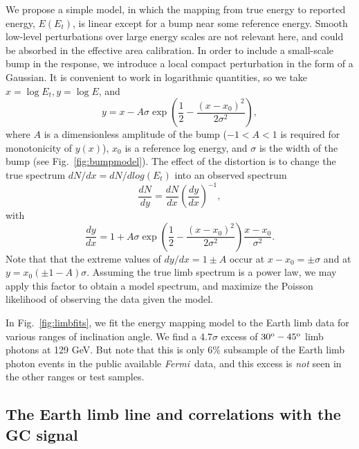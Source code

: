 \documentclass[aps,twocolumn,prd,superscriptaddress,showpacs,nofootinbib,fixfloat]{revtex4}
\newcommand{\be}{\begin{equation}}
\newcommand{\ee}{\end{equation}}
\newcommand{\Fermi}{{\slshape Fermi}}
\newcommand{\degree}{^{\rm o}}
\begin{document}
We propose a simple model, in
which the mapping from true energy to reported energy,
$E(E_t)$, is linear except for a bump near some reference
energy.  Smooth low-level perturbations over large energy
scales are not relevant here, and could be absorbed in the
effective area calibration.  In order to include a
small-scale bump in the response, we introduce a local
compact perturbation in the form of a Gaussian.  It is
convenient to work in logarithmic quantities, so we take
$x=\log E_t, y=\log E$, and \be
\label{eq:yofx}
y=x - A\sigma \exp\left(\frac{1}{2}-\frac{(x-x_0)^2}{2\sigma^2}\right),
\ee
where $A$ is a dimensionless amplitude of the bump ($-1<A<1$
is required for monotonicity of $y(x)$), $x_0$ is a
reference log energy, and $\sigma$ is the width of the bump (see
Fig.~\ref{fig:bumpmodel}).  The effect of the distortion is
to change the true spectrum $dN/dx = dN/dlog(E_t)$ into an
observed spectrum
\be
\label{eq:dndy}
\frac{dN}{dy} = \frac{dN}{dx} \left(\frac{dy}{dx}\right)^{-1} ,
\ee
with
\be
\label{eq:dydx}
\frac{dy}{dx} = 1 + A\sigma \exp\left(\frac{1}{2}-\frac{(x-x_0)^2}{2\sigma^2}\right)
\frac{x-x_0}{\sigma^2}.
\ee
Note that that the extreme values of $dy/dx = 1 \pm A$ occur
at $x-x_0 = \pm \sigma$ and at $y=x_0(\pm1-A)\sigma$.
Assuming the true limb spectrum is a power law, we may apply
this factor to obtain a model spectrum, and maximize the
Poisson likelihood of observing the data given the model.


In Fig.~\ref{fig:limbfits}, we fit the energy mapping model
to the Earth limb data for various ranges of inclination
angle. We find a 4.7$\sigma$ excess of $30\degree-45\degree$
limb photons at 129 GeV. But note that this is only 6\% subsample of the Earth
limb photon events in the public available \Fermi\ data, and this excess is
\emph{not} seen in the other ranges or test samples.

\subsection{The Earth limb line and correlations with the GC signal}
\end{document}

